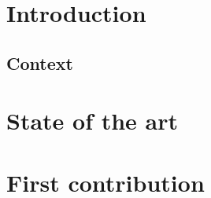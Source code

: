 \documentclass[8pt]{beamer}
\begin{document}
\firstpage

\section{Introduction}
		\subsection{Context}
		

\tableofcontent

%		
%		

\section{State of the art}
		
		

\section{First contribution}
		
		
		
		
		
		
\end{document}
